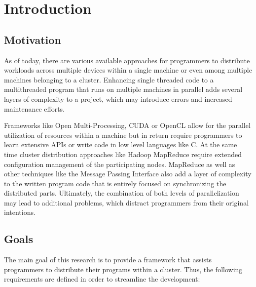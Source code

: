 \chapter{Introduction}

\section{Motivation}

As of today, there are various available approaches for programmers to distribute workloads across multiple devices within a single machine or even among multiple machines belonging to a cluster. Enhancing single threaded code to a multithreaded program that runs on multiple machines in parallel adds several layers of complexity to a project, which may introduce errors and increased maintenance efforts.

Frameworks like Open Multi-Processing, CUDA or OpenCL allow for the parallel utilization of resources within a machine but in return require programmers to learn extensive APIs or write code in low level languages like C.
At the same time cluster distribution approaches like Hadoop MapReduce require extended configuration management of the participating nodes. MapReduce as well as other techniques like the Message Passing Interface also add a layer of complexity to the written program code that is entirely focused on synchronizing the distributed parts. 
Ultimately, the combination of both levels of parallelization may lead to additional problems, which distract programmers from their original intentions.

\section{Goals}

The main goal of this research is to provide a framework that assists programmers to distribute their programs within a cluster. Thus, the following requirements are defined in order to streamline the development:

